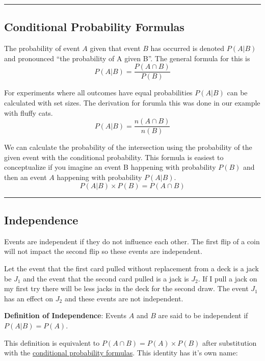 \documentclass[
]{book}
\theoremstyle{definition}
\theoremstyle{definition}
\theoremstyle{definition}
\theoremstyle{remark}
\begin{document}
\begin{center}\rule{0.5\linewidth}{0.5pt}\end{center}

\hypertarget{condprob}{%
\subsection{Conditional Probability Formulas}\label{condprob}}

The probability of event \(A\) given that event \(B\) has occurred is denoted \(P(A|B)\) and pronounced ``the probability of A given B''.
The general formula for this is \[P(A|B)=\frac{P(A \cap B)}{P(B)}\]

For experiments where all outcomes have equal probabilities \(P(A|B)\) can be calculated with set sizes. The derivation for forumla this was done in our example with fluffy cats. \[P(A|B)=\frac{n(A \cap B)}{n(B)}\]

We can calculate the probability of the intersection using the probability of the given event with the conditional probability. This formula is easiest to conceptualize if you imagine an event B happening with probability \(P(B)\) and then an event \(A\) happening with probability \(P(A|B)\). \[P(A|B) \times P(B) = P(A \cap B)\]

\begin{center}\rule{0.5\linewidth}{0.5pt}\end{center}

\hypertarget{independence}{%
\subsection{Independence}\label{independence}}

Events are independent if they do not influence each other. The first flip of a coin will not impact the second flip so these events are independent.

Let the event that the first card pulled without replacement from a deck is a jack be \(J_1\) and the event that the second card pulled is a jack is \(J_2\). If I pull a jack on my first try there will be less jacks in the deck for the second draw. The event \(J_1\) has an effect on \(J_2\) and these events are not independent.

\textbf{Definition of Independence}: Events \(A\) and \(B\) are said to be independent if \(P(A|B)=P(A)\).

This definition is equivalent to \(P(A \cap B) = P(A) \times P(B)\) after substitution with the \protect\hyperlink{condprob}{conditional probability formulas}. This identity has it's own name:
\end{document}
